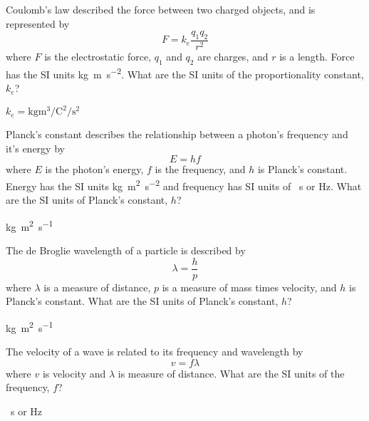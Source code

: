 \begin{question}[ID=DA04,topic=measurement,difficulty=easy]
    Coulomb's law described the force between two charged objects, and is represented by
    \begin{equation*}
        F = k_e \frac{q_1 q_2}{r^2}
    \end{equation*}
    where $F$ is the electrostatic force, $q_1$ and $q_2$ are charges, and $r$ is a length.
    Force has the SI units \si{\kilo\gram\meter\per\second\squared}.
    What are the SI units of the proportionality constant, $k_e$?
\end{question}
\begin{solution}
    $k_e = \si{\kilo\gram\meter\cubed\per\coulomb\squared\per\second\squared}$
\end{solution}

\begin{question}[ID=DA05,topic=measurement,difficulty=easy]
    Planck's constant describes the relationship between a photon's frequency
        and it's energy by
    \begin{equation*}
        E = h f
    \end{equation*}
    where $E$ is the photon's energy, $f$ is the frequency, and $h$ is Planck's constant.
    Energy has the SI units \si{\kilo\gram\meter\squared\per\second\squared}
        and frequency has SI units of \si{\per\second} or \si{\hertz}.
    What are the SI units of Planck's constant, $h$?
\end{question}
\begin{solution}
    \si{\kilo\gram\meter\squared\per\second}
\end{solution}

\begin{question}[ID=DA06,topic=measurement,difficulty=easy]
    The de Broglie wavelength of a particle is described by
    \begin{equation*}
        \lambda = \frac{h}{p}
    \end{equation*}
    where $\lambda$ is a measure of distance, $p$ is a measure of mass times velocity,
        and $h$ is Planck's constant.
    What are the SI units of Planck's constant, $h$?
\end{question}
\begin{solution}
    \si{\kilo\gram\meter\squared\per\second}
\end{solution}

\begin{question}[ID=DA06,topic=measurement,difficulty=easy]
    The velocity of a wave is related to its frequency and wavelength by
    \begin{equation*}
        v = f \lambda
    \end{equation*}
    where $v$ is velocity and $\lambda$ is measure of distance.
    What are the SI units of the frequency, $f$?
\end{question}
\begin{solution}
    \si{\per\second} or \si{\hertz}
\end{solution}

